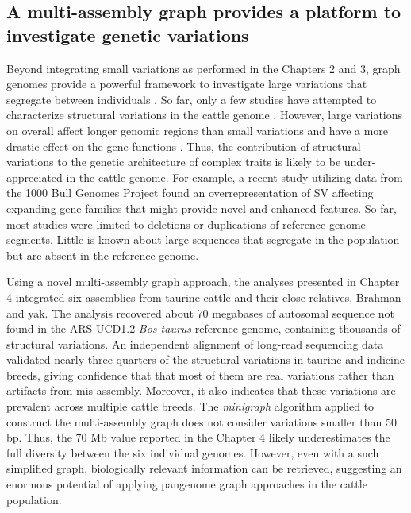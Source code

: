 \documentclass[../main.tex]{subfiles}
\begin{document}
\subsection*{A multi-assembly graph provides a platform to investigate genetic variations}

Beyond integrating small variations as performed in the Chapters 2 and 3, graph genomes provide a powerful framework to investigate large variations that segregate between individuals \citep{eggertsson2019graphtyper2,chen2019paragraph,siren2020genotyping}. So far, only a few studies have attempted to characterize structural variations in the cattle genome \citep{liu2010analysis,bickhart2012copy,boussaha2015genome,chen2017detection,Hu2020}. However, large variations on overall affect longer genomic regions than small variations and have a more drastic effect on the gene functions \citep{chiang2017impact,scott2021structural}. Thus, the contribution of structural variations to the genetic architecture of complex traits is likely to be under-appreciated in the cattle genome.
For example, a recent study utilizing data from the 1000 Bull Genomes Project \citep{chen2017detection} found an overrepresentation of SV affecting expanding gene families that might provide novel and enhanced features. So far, most studies were limited to deletions or duplications of reference genome segments. Little is known about large sequences that segregate in the population but are absent in the reference genome. 


Using a novel multi-assembly graph approach, the analyses presented in Chapter 4 integrated six assemblies from taurine cattle and their close relatives, Brahman and yak. The analysis recovered about 70 megabases of autosomal sequence not found in the ARS-UCD1.2 \emph{Bos taurus} reference genome, containing thousands of structural variations. An independent alignment of long-read sequencing data validated nearly three-quarters of the structural variations in taurine and indicine breeds, giving confidence that that most of them are real variations rather than artifacts from mis-assembly. Moreover, it also indicates that these variations are prevalent across multiple cattle breeds. The \emph{minigraph} algorithm applied to construct the multi-assembly graph does not consider variations smaller than 50 bp. Thus, the 70 Mb value reported in the Chapter 4 likely underestimates the full diversity between the six individual genomes. However, even with a such simplified graph, biologically relevant information can be retrieved, suggesting an enormous potential of applying pangenome graph approaches in the cattle population. 
\end{document}
